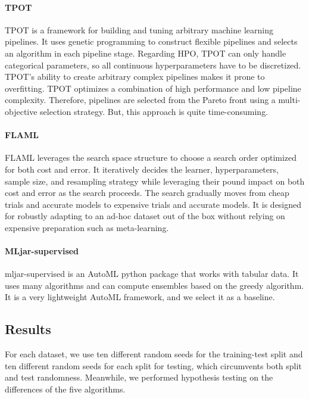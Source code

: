 \documentclass[review]{elsarticle}
\begin{document}
\paragraph{TPOT}
TPOT\cite{DBLP:books/sp/19/OlsonM19} is a framework for building and tuning arbitrary machine learning pipelines. It uses genetic programming to construct flexible pipelines and selects an algorithm in each pipeline stage. Regarding HPO, TPOT can only handle categorical parameters, so all continuous hyperparameters have to be discretized. TPOT's ability to create arbitrary complex pipelines makes it prone to overfitting. TPOT optimizes a combination of high performance and low pipeline complexity. Therefore, pipelines are selected from the Pareto front using a multi-objective selection strategy. But, this approach is quite time-consuming.
\paragraph{FLAML}
FLAML\cite{DBLP:conf/mlsys/0001WWZ21} leverages the search space structure to choose a search order optimized for both cost and error. It iteratively decides the learner, hyperparameters, sample size, and resampling strategy while leveraging their pound impact on both cost and error as the search proceeds. The search gradually moves from cheap trials and accurate models to expensive trials and accurate  models. It is designed for robustly adapting to an ad-hoc dataset out of the box without relying on expensive preparation such as meta-learning.
\paragraph{MLjar-supervised}
mljar-supervised\cite{mljar} is an AutoML python package that works with tabular data. It uses many algorithms and can compute ensembles based on the greedy algorithm. It is a very lightweight AutoML framework, and we select it as a baseline.

\subsection{Results}
For each dataset, we use ten different random seeds for the training-test split and ten different random seeds for each split for testing, which circumvents both split and test randomness. Meanwhile, we performed hypothesis testing on the differences of the five algorithms.
\end{document}
